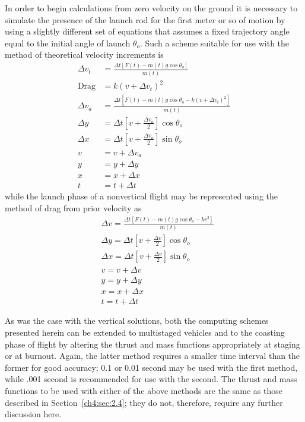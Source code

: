 In order to begin calculations from zero velocity on the ground it is necessary to simulate the
presence of the launch rod for the first meter or so of motion by using a slightly different set
of equations that assumes a fixed trajectory angle equal to the initial angle of launch
$\theta_o$. Such a scheme suitable for use with the method of theoretical velocity increments is
\begin{align}
\Delta v_t &= \frac{\Delta t[F(t) - m(t)g\cos\theta_o]}{m(t)} \label{ch4:eq:116}\\
\text{Drag} &= k(v + \Delta v_t)^{2} \label{ch4:eq:117}\\
\Delta v_a &= \frac{\Delta t[F(t) - m(t)g\cos\theta_o - k(v + \Delta v_t)^{2}]}{m(t)}
  \label{ch4:eq:118}\\
\Delta y &= \Delta t\left[v + \frac{\Delta v_a}{2}\right]\cos\theta_o \label{ch4:eq:119}\\
\Delta x &= \Delta t\left[v + \frac{\Delta v_a}{2}\right]\sin\theta_o \label{ch4:eq:120}\\
v &= v + \Delta v_a \label{ch4:eq:121}\\
y &= y + \Delta y \label{ch4:eq:122}\\
x &= x + \Delta x \label{ch4:eq:123}\\
t &= t + \Delta t \label{ch4:eq:124}
\end{align}
while the launch phase of a nonvertical flight may be represented using the method of drag from
prior velocity as
\begin{align}
&\Delta v = \frac{\Delta t[F(t) - m(t)g\cos\theta_o - kv^{2}]}{m(t)} \label{ch4:eq:125}\\
&\Delta y = \Delta t\left[v + \frac{\Delta v}{2}\right]\cos\theta_o \label{ch4:eq:126}\\
&\Delta x = \Delta t\left[v + \frac{\Delta v}{2}\right]\sin\theta_o \label{ch4:eq:127}\\
&v = v + \Delta v \label{ch4:eq:128}\\
&y = y + \Delta y \label{ch4:eq:129}\\
&x = x + \Delta x \label{ch4:eq:130}\\
&t = t + \Delta t \label{ch4:eq:131}
\end{align}

As was the case with the vertical solutions, both the computing schemes presented herein can be
extended to multistaged vehicles and to the coasting phase of flight by altering the thrust and
mass functions appropriately at staging or at burnout. Again, the latter method requires a smaller
time interval than the former for good accuracy; 0.1 or 0.01 second may be used with the first
method, while .001 second is recommended for use with the second. The thrust and mass functions to
be used with either of the above methods are the same as those described in
Section~\ref{ch4:sec:2.4}; they do not, therefore, require any further discussion here.

